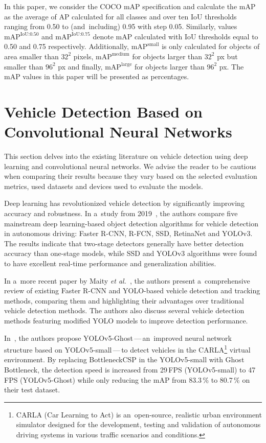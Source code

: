 In this paper, we consider the COCO mAP specification and calculate the mAP as
the average of AP calculated for all classes and over ten IoU thresholds ranging
from \num{0.50} to (and~including) \num{0.95} with step \num{0.05}. Similarly,
values $\text{mAP}^{\text{IoU:0.50}}$ and $\text{mAP}^{\text{IoU:0.75}}$ denote
mAP calculated with IoU thresholds equal to \num{0.50} and \num{0.75}
respectively. Additionally, $\text{mAP}^{\text{small}}$ is only calculated for
objects of area smaller than $32^2$ pixels, $\text{mAP}^{\text{medium}}$ for
objects larger than $32^2$ px but smaller than $96^2$ px and finally,
$\text{mAP}^{\text{large}}$ for objects larger than $96^2$ px. The mAP values
in this paper will be presented as percentages.




\section{Vehicle Detection Based on Convolutional Neural Networks}

This section delves into the existing literature on vehicle detection using deep
learning and convolutional neural networks. We advise the reader to be cautious
when comparing their results because they vary based on the selected evaluation
metrics, used datasets and devices used to evaluate the models.

Deep learning has revolutionized vehicle detection by significantly improving
accuracy and robustness. In a~study from 2019~\cite{Wang2019}, the authors
compare five mainstream deep learning-based object detection algorithms for
vehicle detection in autonomous driving: Faster R-CNN, R-FCN, SSD, RetinaNet
and YOLOv3. The results indicate that two-stage detectors generally have better
detection accuracy than one-stage models, while SSD and YOLOv3 algorithms were
found to have excellent real-time performance and generalization abilities. 

In a~more recent paper by Maity \textit{et al.}~\cite{Maity2021},
the authors present a~comprehensive review of existing Faster R-CNN and
YOLO-based vehicle detection and tracking methods, comparing them and
highlighting their advantages over traditional vehicle detection methods. The
authors also discuss several vehicle detection methods featuring modified YOLO
models to improve detection performance.

In~\cite{Wu2021}, the authors propose YOLOv5-Ghost\,---\,an~improved neural
network structure based on YOLOv5-small\,---\,to detect vehicles in the
CARLA\footnote{CARLA (Car Learning to Act) is an~open-source, realistic urban
environment simulator designed for the development, testing and validation of
autonomous driving systems in various traffic scenarios and conditions.} virtual
environment. By replacing BottleneckCSP in the YOLOv5-small with Ghost
Bottleneck, the detection speed is increased from 29\,FPS (YOLOv5-small) to 47\,FPS
(YOLOv5-Ghost) while only reducing the mAP from \num{83.3}\,\% to \num{80.7}\,\%
on their test dataset.

